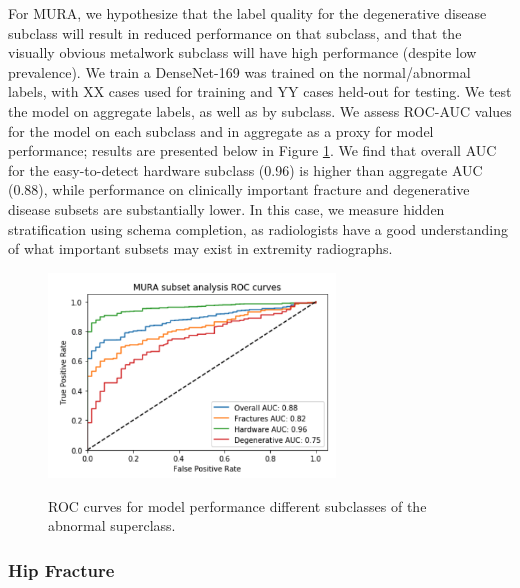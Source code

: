 \documentclass{article}
\begin{document}
For MURA, we hypothesize that the label quality for the degenerative disease subclass will result in reduced performance on that subclass, and that the visually obvious metalwork subclass will have high performance (despite low prevalence).
 We train a DenseNet-169 was trained on the normal/abnormal labels, with XX cases used for training and YY cases held-out for testing.  
 We test the model on aggregate labels, as well as by subclass.  
 We assess ROC-AUC values for the model on each subclass and in aggregate as a proxy for model performance; results are presented below in Figure \ref{fig:mura}.  
 We find that overall AUC for the easy-to-detect hardware subclass (0.96) is higher than aggregate AUC (0.88), while performance on clinically important fracture and degenerative  disease subsets are substantially lower.  
 In this case, we measure hidden stratification using schema completion, as radiologists have a good understanding of what important subsets may exist in extremity radiographs.

 \begin{figure}[htb!]
 \centering
\includegraphics[width=3in]{MURA-ROC-temp.png}
\label{fig:mura}
\caption{ROC curves for model performance different subclasses of the abnormal superclass.}
\end{figure}

\subsubsection{Hip Fracture}
\end{document}
